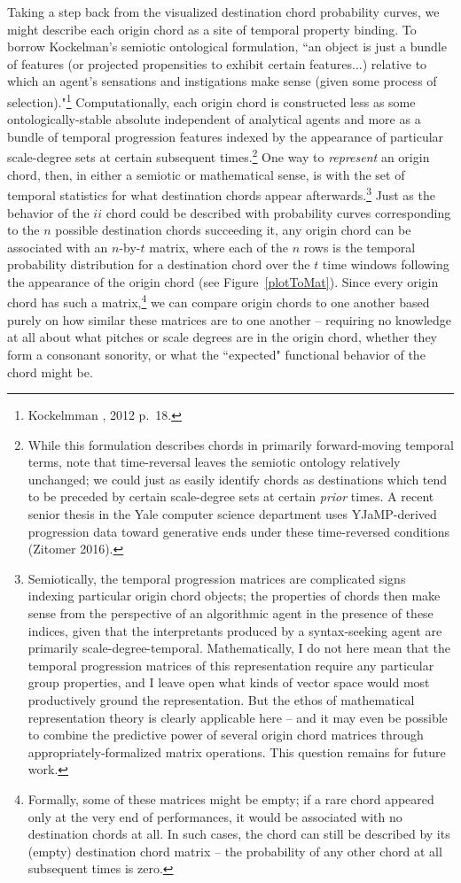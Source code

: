 Taking a step back from the visualized destination chord probability curves, we might describe each origin chord as a site of temporal property binding.  To borrow Kockelman's semiotic ontological formulation, ``an object is just a bundle of features (or projected propensities to exhibit certain features...) relative to which an agent's sensations and instigations make sense (given some process of selection)."\footnote{Kockelmman , 2012 p.\ 18.}  Computationally, each origin chord is constructed less as some ontologically-stable absolute independent of analytical agents and more as a bundle of temporal progression features indexed by the appearance of particular scale-degree sets at certain subsequent times.\footnote{While this formulation describes chords in primarily forward-moving temporal terms, note that time-reversal leaves the semiotic ontology relatively unchanged; we could just as easily identify chords as destinations which tend to be preceded by certain scale-degree sets at certain \emph{prior} times.  A recent senior thesis in the Yale computer science department uses YJaMP-derived progression data toward generative ends under these time-reversed conditions (Zitomer 2016).}  One way to \emph{represent} an origin chord, then, in either a semiotic or mathematical sense, is with the set of temporal statistics for what destination chords appear afterwards.\footnote{Semiotically, the temporal progression matrices are complicated signs indexing particular origin chord objects; the properties of chords then make sense from the perspective of an algorithmic agent in the presence of these indices, given that the interpretants produced by a syntax-seeking agent are primarily scale-degree-temporal.  Mathematically, I do not here mean that the temporal progression matrices of this representation require any particular group properties, and I leave open what kinds of vector space would most productively ground the representation.  But the ethos of mathematical representation theory is clearly applicable here -- and it may even be possible to combine the predictive power of several origin chord matrices through appropriately-formalized matrix operations.  This question remains for future work.}  Just as the behavior of the $ii$ chord could be described with probability curves corresponding to the $n$ possible destination chords succeeding it, any origin chord can be associated with an $n$-by-$t$ matrix, where each of the $n$ rows is the temporal probability distribution for a destination chord over the $t$ time windows following the appearance of the origin chord (see Figure~\ref{plotToMat}).  Since every origin chord has such a matrix,\footnote{Formally, some of these matrices might be empty; if a rare chord appeared only at the very end of performances, it would be associated with no destination chords at all.  In such cases, the chord can still be described by its (empty) destination chord matrix -- the probability of any other chord at all subsequent times is zero.} we can compare origin chords to one another based purely on how similar these matrices are to one another -- requiring no knowledge at all about what pitches or scale degrees are in the origin chord, whether they form a consonant sonority, or what the ``expected" functional behavior of the chord might be.

